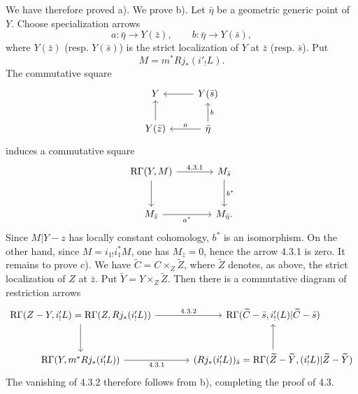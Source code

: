 \documentclass[11pt]{article}
\begin{document}
We have therefore proved a). We prove b). Let $\bar\eta$ be a geometric generic point of $Y$. Choose specialization arrows
\[
a:\bar\eta\to Y(\bar z),\qquad b:\bar\eta\to Y(\bar s),
\]
where $Y(\bar z)$ (resp. $Y(\bar s)$) is the strict localization of $Y$ at $\bar z$ (resp. $\bar s$). Put
\[
M=m^*Rj_*(i'_!L).
\]
The commutative square
\[
\begin{tikzcd}
Y & Y(\bar s) \arrow[l]\\
Y(\bar z) \arrow[u] & \bar\eta \arrow[l,"a"'] \arrow[u,"b"']
\end{tikzcd}
\]
induces a commutative square
\[
\begin{tikzcd}[column sep=large,row sep=large]
\mathrm R\Gamma(Y,M) \arrow[r,"4.3.1"] \arrow[d] & M_{\bar s} \arrow[d,"b^*"]\\
M_{\bar z} \arrow[r,"a^*"'] & M_{\bar\eta}.
\end{tikzcd}
\]
Since $M|Y-z$ has locally constant cohomology, $b^*$ is an isomorphism. On the other hand, since $M=i_{1!}i_1^*M$, one has $M_{\bar z}=0$, hence the arrow 4.3.1 is zero. It remains to prove c). We have $\widetilde C=C\times_Z\widetilde Z$, where $\widetilde Z$ denotes, as above, the strict localization of $Z$ at $\bar z$. Put $\widetilde Y=Y\times_Z\widetilde Z$. Then there is a commutative diagram of restriction arrows
\[
\begin{tikzcd}[column sep=large,row sep=large]
\mathrm R\Gamma(Z-Y,i'_!L)=\mathrm R\Gamma(Z,Rj_*(i'_!L))
 \arrow[r,"4.3.2"] \arrow[d]
&
\mathrm R\Gamma(\widetilde C-\bar s,i'_!(L)|\widetilde C-\bar s)\\
\mathrm R\Gamma(Y,m^*Rj_*(i'_!L)) \arrow[r,"4.3.1"']
&
(Rj_*(i'_!L))_{\bar s}
  =\mathrm R\Gamma(\widetilde Z-\widetilde Y,(i'_!L)|\widetilde Z-\widetilde Y) \arrow[u]
\end{tikzcd}
\]
The vanishing of 4.3.2 therefore follows from b), completing the proof of 4.3.
\end{document}
